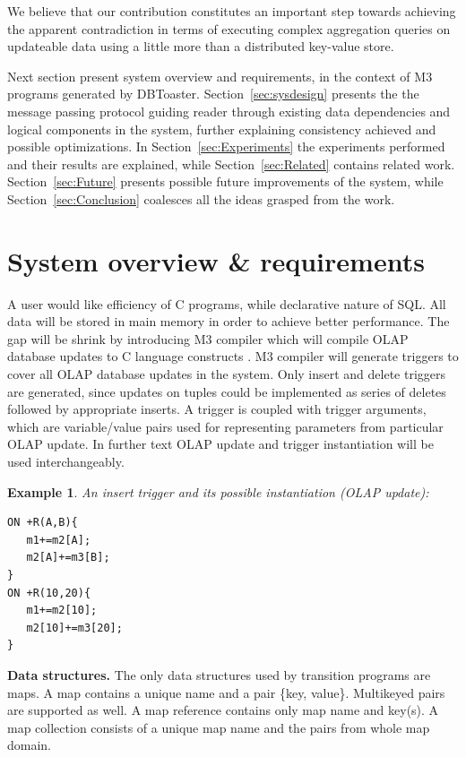 \documentclass{sig-semester}
\newtheorem{example}[theorem]{Example}
\def\SQL{SQL\xspace}
\def\OLAP{OLAP\xspace}
\def\M3{M3\xspace}
\begin{document}
We believe that our contribution constitutes an important step towards achieving the apparent contradiction in terms of executing complex aggregation queries on updateable data using a little more than a distributed key-value store.

Next section present system overview and requirements, in the context of \M3 programs generated by DBToaster. Section~\ref{sec:sysdesign} presents the the message passing protocol guiding reader through existing data dependencies and logical components in the system, further explaining consistency achieved and possible optimizations. In Section~\ref{sec:Experiments} the experiments performed and their results are explained, while Section~\ref{sec:Related} contains related work. Section~\ref{sec:Future} presents possible future improvements of the system, while Section~\ref{sec:Conclusion} coalesces all the ideas grasped from the work.

\section{System overview \& requirements}
\vspace{2mm}

A user would like efficiency of C programs, while declarative nature of \SQL. All data will be stored in main memory in order to achieve better performance. The gap will be shrink by introducing \M3 compiler which will compile \OLAP database updates to C language constructs \cite{DBToasterCompiler09}. \M3 compiler will generate triggers to cover all \OLAP database updates in the system. Only insert and delete triggers are generated, since updates on tuples could be implemented as series of deletes followed by appropriate inserts. A trigger is coupled with trigger arguments, which are variable/value pairs used for representing parameters from particular \OLAP update. In further text \OLAP update and trigger instantiation will be used interchangeably.

\begin{example} \em
\label{ex:simpleTrigger}
An insert trigger and its possible instantiation (\OLAP update):
\begin{verbatim}
ON +R(A,B){
   m1+=m2[A];
   m2[A]+=m3[B];
}
ON +R(10,20){
   m1+=m2[10];
   m2[10]+=m3[20];
} 
\end{verbatim}
\end{example}

\textbf{Data structures.} The only data structures used by transition programs are maps. A map contains a unique name and a pair \{key, value\}. Multikeyed pairs are supported as well. A map reference contains only map name and key(s). A map collection consists of a unique map name and the pairs from whole map domain.
\end{document}
